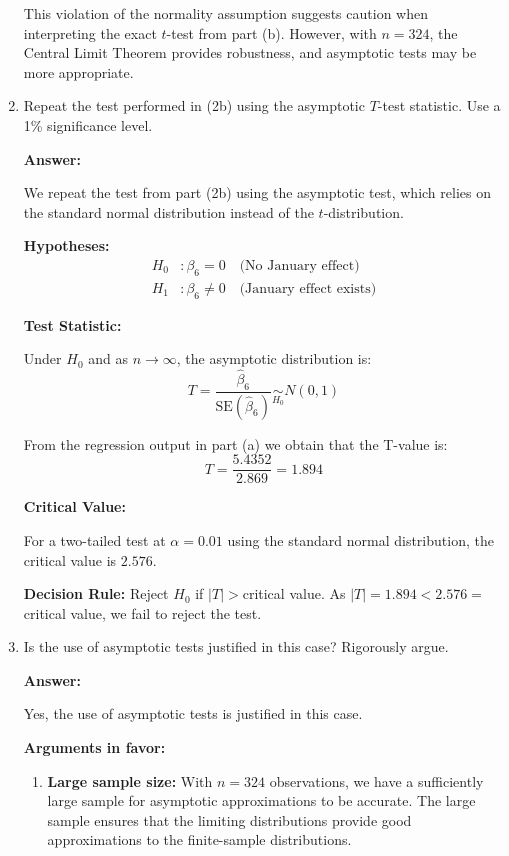 \documentclass[12pt,a4paper]{article}
\begin{document}
\begin{enumerate}[label=(\alph*)]
This violation of the normality assumption suggests caution when interpreting the exact $t$-test from part (b). However, with $n=324$, the Central Limit Theorem provides robustness, and asymptotic tests may be more appropriate.
  
  \item Repeat the test performed in (2b) using the asymptotic $T$-test statistic. Use a 1\% significance level.
  
  \textbf{Answer:} 

We repeat the test from part (2b) using the asymptotic test, 
which relies on the standard normal distribution instead of 
the $t$-distribution.

\textbf{Hypotheses:}
\begin{align*}
H_0&: \beta_6 = 0 \quad \text{(No January effect)} \\
H_1&: \beta_6 \neq 0 \quad \text{(January effect exists)}
\end{align*}

\textbf{Test Statistic:}

Under $H_0$ and as $n \to \infty$, the asymptotic distribution is:
$$T = \frac{\hat{\beta}_6}{\text{SE}(\hat{\beta}_6)} 
\underset{H_0}{\sim} N(0,1)$$

From the regression output in part (a) we obtain that the   T-value is:
$$T = \frac{5.4352}{2.869} = 1.894$$

\textbf{Critical Value:}

For a two-tailed test at $\alpha = 0.01$ using the standard 
normal distribution, the critical value is $2.576$.

\textbf{Decision Rule:} Reject $H_0$ if $|T| > $critical value. As $|T|= 1.894 < 2.576 = $ critical value, we fail to reject the test.

  \item Is the use of asymptotic tests justified in this case? Rigorously argue.
  
  \textbf{Answer:} 

  Yes, the use of asymptotic tests is justified in this case.

\textbf{Arguments in favor:}

\begin{enumerate}
\item \textbf{Large sample size:} With $n = 324$ observations, 
we have a sufficiently large sample for asymptotic approximations 
to be accurate. The large sample ensures that the limiting 
distributions provide good approximations to the finite-sample 
distributions.


\end{enumerate}
\end{enumerate}
\end{document}
